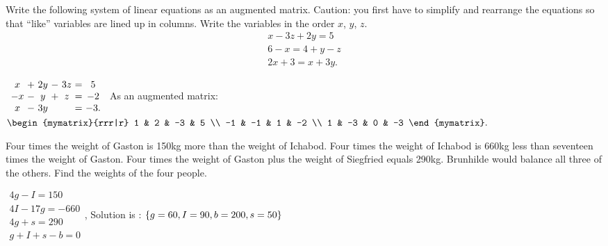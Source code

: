 \begin{ex}
  Write the following system of linear equations as an augmented
  matrix. Caution: you first have to simplify and rearrange the
  equations so that ``like'' variables are lined up in columns. Write
  the variables in the order $x$, $y$, $z$.
  \begin{equation*}
    \begin{array}{c}
      x - 3z + 2y = 5 \\
      6 - x = 4 + y - z \\
      2x + 3 = x + 3y.
    \end{array}
  \end{equation*}

  \begin{sol}
    $
    \begin{array}{c@{~}c@{~}c@{~}c@{~}c@{~}c@{~}c}
      x &+& 2y &-& 3z &=& 5 \\
      -x &-& y &+& z &=& -2 \\
      x &-& 3y && &=& -3. \\
    \end{array}
    $
    As an augmented matrix:
    $
    \begin{mymatrix}{rrr|r}
      1 & 2 & -3 & 5 \\
      -1 & -1 & 1 & -2 \\
      1 & -3 & 0 & -3
    \end{mymatrix}.
    $
  \end{sol}
\end{ex}

\begin{ex}
  Four times the weight of Gaston is 150kg more than the weight of
  Ichabod. Four times the weight of Ichabod is 660kg less than seventeen
  times the weight of Gaston. Four times the weight of Gaston plus the weight
  of Siegfried equals 290kg. Brunhilde would balance all three of the
  others. Find the weights of the four people.
  \begin{sol}
    $
    \begin{array}{c}
      4g-I=150 \\
      4I-17g=-660 \\
      4g+s=290 \\
      g+I+s-b=0
    \end{array}
    $, Solution is : $\left\{g=60,I=90,b=200,s=50\right\} $
  \end{sol}
\end{ex}

